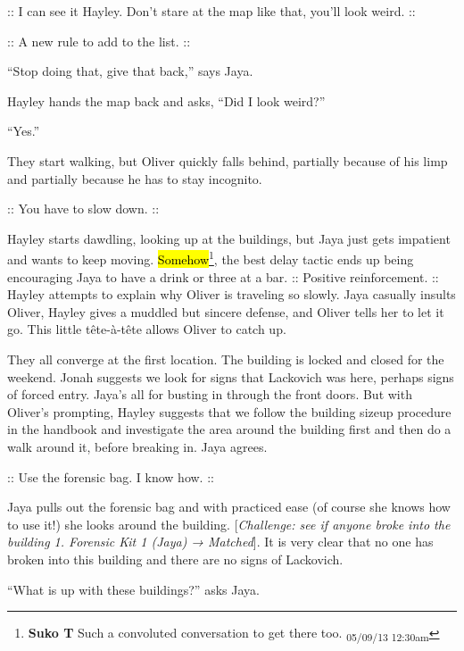 :: {\color[RGB]{106,168,79}I can see it Hayley.  Don't stare at the map like that, you'll look weird.} ::

:: {\color[RGB]{230,145,56}A new rule to add to the list.} ::

``Stop doing that, give that back,'' says Jaya.

Hayley hands the map back and asks, ``Did I look weird?''

``Yes.''



They start walking, but Oliver quickly falls behind, partially because of his limp and partially because he has to stay incognito.

:: {\color[RGB]{106,168,79}You have to slow down.} ::

Hayley starts dawdling, looking up at the buildings, but Jaya just gets impatient and wants to keep moving.  \hl{Somehow}\footnote{\textbf{Suko T }Such a convoluted conversation to get there too. \textsubscript{05/09/13 12:30am}}, the best delay tactic ends up being encouraging Jaya to have a drink or three at a bar.  :: {\color[RGB]{106,168,79}Positive reinforcement.} ::  Hayley attempts to explain why Oliver is traveling so slowly.  Jaya casually insults Oliver, Hayley gives a muddled but sincere defense, and Oliver tells her to let it go.  This little tête-à-tête allows Oliver to catch up.



They all converge at the first location.  The building is locked and closed for the weekend.  Jonah suggests we look for signs that Lackovich was here, perhaps signs of forced entry.   Jaya's all for busting in through the front doors.  But with Oliver's prompting, Hayley suggests that we follow the building sizeup procedure in the handbook and investigate the area around the building first and then do a walk around it, before breaking in.  Jaya agrees.  



:: {\color[RGB]{60,120,216}Use the forensic bag.  I know how.} ::

Jaya pulls out the forensic bag and with practiced ease (of course she knows how to use it!) she looks around the building. {[}\textit{Challenge: see if anyone broke into the building 1. Forensic Kit 1 (Jaya) → Matched}{]}.  It is very clear that no one has broken into this building and there are no signs of Lackovich.



``What is up with these buildings?'' asks Jaya.

